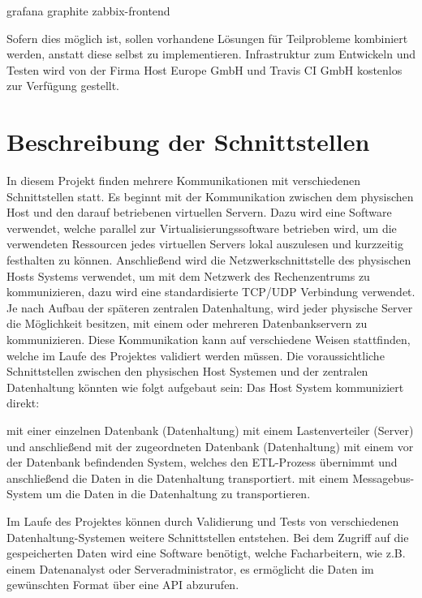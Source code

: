 \begin{outline}
  \1 grafana
  \1 graphite
  \1 zabbix-frontend
\end{outline}

Sofern dies möglich ist, sollen vorhandene Lösungen für Teilprobleme
kombiniert werden, anstatt diese selbst zu implementieren. Infrastruktur zum
Entwickeln und Testen wird von der Firma Host Europe GmbH und Travis CI GmbH
kostenlos zur Verfügung gestellt.

\section{Beschreibung der Schnittstellen}

In diesem Projekt finden mehrere Kommunikationen mit verschiedenen
Schnittstellen statt. Es beginnt mit der Kommunikation zwischen dem
physischen Host und den darauf betriebenen virtuellen Servern. Dazu wird eine
Software verwendet, welche parallel zur Virtualisierungssoftware betrieben
wird, um die verwendeten Ressourcen jedes virtuellen Servers lokal auszulesen
und kurzzeitig festhalten zu können. Anschließend wird die
Netzwerkschnittstelle des physischen Hosts Systems verwendet, um mit dem
Netzwerk des Rechenzentrums zu kommunizieren, dazu wird eine standardisierte
TCP/UDP Verbindung verwendet. Je nach Aufbau der späteren zentralen
Datenhaltung, wird jeder physische Server die Möglichkeit besitzen, mit einem
oder mehreren Datenbankservern zu kommunizieren. Diese Kommunikation kann auf
verschiedene Weisen stattfinden, welche im Laufe des Projektes validiert
werden müssen. Die voraussichtliche Schnittstellen zwischen den physischen
Host Systemen und der zentralen Datenhaltung könnten wie folgt aufgebaut sein:
Das Host System kommuniziert direkt:

\begin{outline}
  \1 mit einer einzelnen Datenbank (Datenhaltung)
  \1 mit einem Lastenverteiler (Server) und anschließend mit der zugeordneten
  Datenbank (Datenhaltung)
  \1 mit einem vor der Datenbank befindenden System, welches den ETL-Prozess
  übernimmt und anschließend die Daten in die Datenhaltung transportiert.
  \1 mit einem Messagebus-System um die Daten in die Datenhaltung zu
  transportieren.
\end{outline}
Im Laufe des Projektes können durch Validierung und Tests von verschiedenen
Datenhaltung-Systemen weitere Schnittstellen entstehen. Bei dem Zugriff auf
die gespeicherten Daten wird eine Software benötigt, welche Facharbeitern, wie
z.B. einem Datenanalyst oder Serveradministrator, es ermöglicht die Daten im
gewünschten Format über eine API abzurufen.

